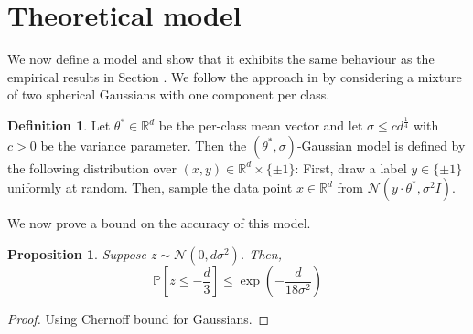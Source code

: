\documentclass{article}
\theoremstyle{plain}
\newtheorem{proposition}[theorem]{Proposition}
\theoremstyle{definition}
\newtheorem{definition}[theorem]{Definition}
\theoremstyle{remark}
\begin{document}
\section{Theoretical model}
\label{Theoretical model}
We now define a model and show that it exhibits the same behaviour as the empirical results in Section . We follow the approach in  by considering a mixture of two spherical Gaussians with one component per class.

\begin{definition}
    \label{def:gaussian-model}
    Let \( \theta^{*}\in\mathbb{R}^d \) be the per-class mean vector and let \( \sigma \leq cd^{\frac{1}{4}} \) with \( c>0 \) be the variance parameter. Then the \( (\theta^*, \sigma) \)-Gaussian model is defined by the following distribution over \( (x,y)\in\mathbb{R}^d\times\{\pm1\} \): First, draw a label \( y\in\{\pm1\} \) uniformly at random. Then, sample the data point \( x\in\mathbb{R}^d \) from \( \mathcal{N}(y\cdot\theta^*, \sigma^2I) \).
\end{definition}

We now prove a bound on the accuracy of this model.

\begin{proposition}
    Suppose \( z\sim\mathcal{N}(0, d\sigma^2) \). Then,
    \begin{equation}
        \mathbb{P}\left[z\leq -\frac{d}{3}\right] \leq \exp\left(-\frac{d}{18\sigma^2}\right)
    \end{equation}
\end{proposition}
\begin{proof}
    Using Chernoff bound for Gaussians.
\end{proof}
\end{document}
